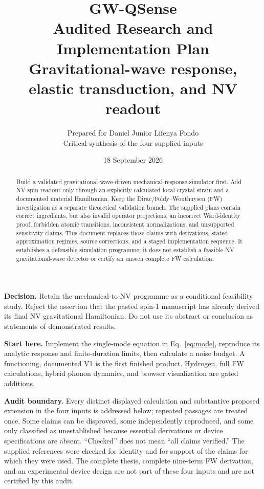 \documentclass[a4paper,11pt]{article}
\title{\color{ink}\bfseries GW-QSense\\[5pt]\Large Audited Research and Implementation Plan\\[6pt]\normalsize Gravitational-wave response, elastic transduction, and NV readout}
\author{Prepared for Daniel Junior Lifenya Fondo\\\small Critical synthesis of the four supplied inputs}
\date{18 September 2026}
\begin{document}
\maketitle

\begin{abstract}
Build a validated gravitational-wave-driven mechanical-response simulator first. Add NV spin readout only through an explicitly calculated local crystal strain and a documented material Hamiltonian. Keep the Dirac/Foldy--Wouthuysen (FW) investigation as a separate theoretical validation branch. The supplied plans contain correct ingredients, but also invalid operator projections, an incorrect Ward-identity proof, forbidden atomic transitions, inconsistent normalizations, and unsupported sensitivity claims. This document replaces those claims with derivations, stated approximation regimes, source corrections, and a staged implementation sequence. It establishes a defensible simulation programme; it does not establish a feasible NV gravitational-wave detector or certify an unseen complete FW calculation.
\end{abstract}

\textbf{Decision.} Retain the mechanical-to-NV programme as a conditional feasibility study. Reject the assertion that the pasted spin-1 manuscript has already derived its final NV gravitational Hamiltonian. Do not use its abstract or conclusion as statements of demonstrated results.

\textbf{Start here.} Implement the single-mode equation in Eq.~\eqref{eq:mode}, reproduce its analytic response and finite-duration limits, then calculate a noise budget. A functioning, documented V1 is the first finished product. Hydrogen, full FW calculations, hybrid phonon dynamics, and browser visualization are gated additions.

\textbf{Audit boundary.} Every distinct displayed calculation and substantive proposed extension in the four inputs is addressed below; repeated passages are treated once. Some claims can be disproved, some independently reproduced, and some only classified as unestablished because essential derivations or device specifications are absent. ``Checked'' does not mean ``all claims verified.'' The supplied references were checked for identity and for support of the claims for which they were used. The complete thesis, complete nine-term FW derivation, and an experimental device design are not part of these four inputs and are not certified by this audit.

\clearpage
\begingroup
\small
\setlength{\parskip}{0pt}
\tableofcontents
\endgroup
\clearpage
\end{document}
